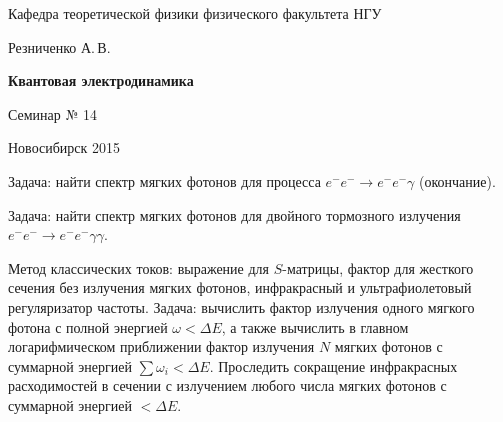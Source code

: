 \documentclass[12pt,pagesize,paper=landscape,paper=192mm:108mm]{scrbook}
\begin{document}
\begin{titlepage}
\begin{center}
    Кафедра теоретической физики физического факультета НГУ
    \medskip

    \Large
    Резниченко А.\,В.
    \bigskip

    \huge
    \textbf{Квантовая электродинамика}
    \bigskip

    \Large
    Семинар № 14
    \vfill

    \normalsize
    \vfill

    \normalsize \ccbysa\hspace{0.5em}  Новосибирск 2015
  \end{center}
\end{titlepage}
\newpage

\vspace*{-1em}
\begin{center}
\vfill
  \begin{minipage}{0.65\linewidth}
    Задача: найти спектр мягких фотонов для процесса $e^-e^-\to e^-e^-\gamma$
    (окончание).
    \smallskip

    Задача: найти спектр мягких фотонов для двойного тормозного
    излучения $e^-e^-\to e^-e^-\gamma\gamma$.
    \smallskip

    Метод классических токов: выражение для $S$-матрицы, фактор для
    жесткого сечения без излучения мягких фотонов, инфракрасный и
    ультрафиолетовый регуляризатор частоты. Задача: вычислить фактор
    излучения одного мягкого фотона с полной энергией $\omega<\Delta
    E$, а также вычислить в главном логарифмическом приближении фактор
    излучения $N$ мягких фотонов с суммарной энергией $\sum\omega_i
    <\Delta E$. Проследить сокращение инфракрасных расходимостей в
    сечении с излучением любого числа мягких фотонов с суммарной
    энергией $<\Delta E$.

  \end{minipage}
  \vfill

\end{center}
\end{document}
